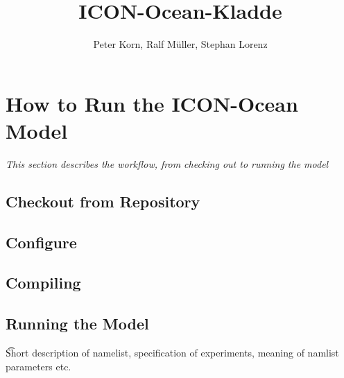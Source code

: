 \documentclass[a4paper,10pt]{article}
\title{ICON-Ocean-Kladde}
\author{Peter Korn, Ralf M\"uller, Stephan Lorenz}
\begin{document}
\maketitle
\newpage
\tableofcontents
\newpage
% 

\section{How to Run the ICON-Ocean Model}
{\it This section describes the workflow, from checking out to running the model}


\subsection{Checkout from Repository}

\subsection{Configure}

\subsection{Compiling}

\subsection{Running the Model}
{\t Short description of namelist, specification of experiments, meaning of namlist 
parameters etc.}


\end{document}
